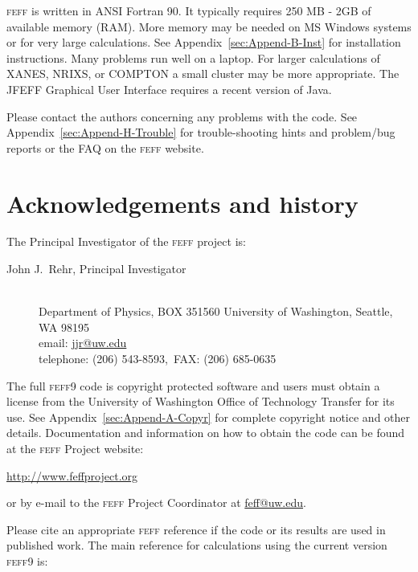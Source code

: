\documentclass[11pt,oneside]{report} %
\renewcommand{\htmladdnormallink}[2]{\href{#2}{#1}}
\renewcommand{\htmlref}[2]{\hyperlink{#2}{#1}}
\newcommand{\program}[1]{\textsc{#1}}
\newcommand{\feff}{\program{feff}}
\newcommand{\vnum}{9}
\newcommand{\feffcur}{\feff\vnum}
\renewcommand{\htmlref}[2]{{#1}} %
\begin{document}
\begin{latexonly}
{\feff} is written in ANSI Fortran 90. It typically requires 250 MB - 2GB of available memory (RAM). More memory may be needed on MS Windows systems or for very large calculations.  See Appendix~\ref{sec:Append-B-Inst} for installation instructions.  Many problems run well on a laptop.  For larger calculations of XANES, NRIXS, or COMPTON a small cluster may be more appropriate.  The JFEFF Graphical User Interface requires a recent version of Java.

Please contact the authors concerning any problems with the code. See
Appendix~\ref{sec:Append-H-Trouble} for trouble-shooting hints and
problem/bug reports or the FAQ on the \htmlref{{\feff} website}
  {http://www.feffproject.org}.




\section{Acknowledgements and history}
\label{Acknowledgements}

The Principal Investigator of the {\feff} project is:
\begin{description}
\item[John J.~Rehr, Principal Investigator]\hfill\\
Department of Physics, BOX 351560 University of Washington, Seattle, WA 98195\\
email: \htmladdnormallink{jjr@uw.edu}
{mailto:jjr@phys.washington.edu}\\
telephone: (206) 543-8593,\  FAX: (206) 685-0635
\end{description}


The full {\feffcur} code is copyright protected software and users must
obtain a license from the University of Washington Office of Technology
Transfer for its use. 
See Appendix~\ref{sec:Append-A-Copyr} for
complete copyright notice and other details. Documentation and
information on how to obtain the code can be found at the {\feff}
Project website:

\centerline{\htmladdnormallink{http://www.feffproject.org}
  {http://www.feffproject.org}}

\noindent or by e-mail to the {\feff} Project Coordinator at
\htmladdnormallink{feff@uw.edu}{mailto:feff@uw.edu}.

Please cite an appropriate {\feff} reference if the code
or its results are used in published work. The main reference for calculations using the current version {\feffcur}  is:


\end{latexonly}
\end{document}
